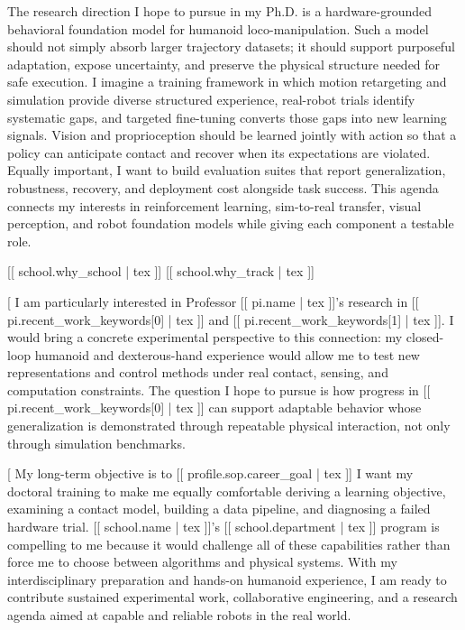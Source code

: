 \documentclass[11pt,letterpaper]{article}
\begin{document}
The research direction I hope to pursue in my Ph.D. is a hardware-grounded behavioral foundation
model for humanoid loco-manipulation. Such a model should not simply absorb larger trajectory
datasets; it should support purposeful adaptation, expose uncertainty, and preserve the physical
structure needed for safe execution. I imagine a training framework in which motion retargeting
and simulation provide diverse structured experience, real-robot trials identify systematic gaps,
and targeted fine-tuning converts those gaps into new learning signals. Vision and proprioception
should be learned jointly with action so that a policy can anticipate contact and recover when its
expectations are violated. Equally important, I want to build evaluation suites that report
generalization, robustness, recovery, and deployment cost alongside task success. This agenda
connects my interests in reinforcement learning, sim-to-real transfer, visual perception, and
robot foundation models while giving each component a testable role.

[[ school.why_school | tex ]] [[ school.why_track | tex ]]

[%
I am particularly interested in Professor [[ pi.name | tex ]]'s research in
[[ pi.recent_work_keywords[0] | tex ]] and [[ pi.recent_work_keywords[1] | tex ]]. I would bring
a concrete experimental perspective to this connection: my closed-loop humanoid and dexterous-hand
experience would allow me to test new representations and control methods under real contact,
sensing, and computation constraints. The question I hope to pursue is how progress in
[[ pi.recent_work_keywords[0] | tex ]] can support adaptable behavior whose generalization is
demonstrated through repeatable physical interaction, not only through simulation benchmarks.

[%
My long-term objective is to [[ profile.sop.career_goal | tex ]] I want my doctoral training to
make me equally comfortable deriving a learning objective, examining a contact model, building a
data pipeline, and diagnosing a failed hardware trial. [[ school.name | tex ]]'s
[[ school.department | tex ]] program is compelling to me because it would challenge all of these
capabilities rather than force me to choose between algorithms and physical systems. With my
interdisciplinary preparation and hands-on humanoid experience, I am ready to contribute sustained
experimental work, collaborative engineering, and a research agenda aimed at capable and reliable
robots in the real world.
\end{document}
